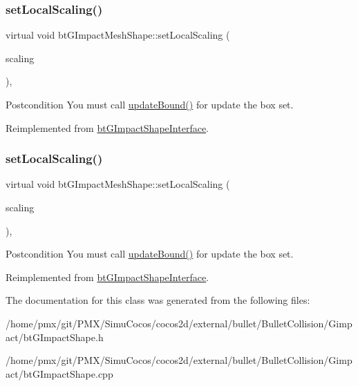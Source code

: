 \subsubsection{\texorpdfstring{set\+Local\+Scaling()}{setLocalScaling()}\hspace{0.1cm}{\footnotesize\ttfamily [1/2]}}
{\footnotesize\ttfamily virtual void bt\+G\+Impact\+Mesh\+Shape\+::set\+Local\+Scaling (\begin{DoxyParamCaption}\item[{const bt\+Vector3 \&}]{scaling }\end{DoxyParamCaption})\hspace{0.3cm}{\ttfamily [inline]}, {\ttfamily [virtual]}}

\begin{DoxyPostcond}{Postcondition}
You must call \hyperlink{classbtGImpactShapeInterface_acb26c2d7a2aecabd06b996b72b848492}{update\+Bound()} for update the box set. 
\end{DoxyPostcond}


Reimplemented from \hyperlink{classbtGImpactShapeInterface_adec0bd43cd0105b1d0dc172bc7db50d8}{bt\+G\+Impact\+Shape\+Interface}.

\mbox{\label{classbtGImpactMeshShape_aed8d5e4b2e75538109909d44b244bc35}} 
\subsubsection{\texorpdfstring{set\+Local\+Scaling()}{setLocalScaling()}\hspace{0.1cm}{\footnotesize\ttfamily [2/2]}}
{\footnotesize\ttfamily virtual void bt\+G\+Impact\+Mesh\+Shape\+::set\+Local\+Scaling (\begin{DoxyParamCaption}\item[{const bt\+Vector3 \&}]{scaling }\end{DoxyParamCaption})\hspace{0.3cm}{\ttfamily [inline]}, {\ttfamily [virtual]}}

\begin{DoxyPostcond}{Postcondition}
You must call \hyperlink{classbtGImpactShapeInterface_acb26c2d7a2aecabd06b996b72b848492}{update\+Bound()} for update the box set. 
\end{DoxyPostcond}


Reimplemented from \hyperlink{classbtGImpactShapeInterface_adec0bd43cd0105b1d0dc172bc7db50d8}{bt\+G\+Impact\+Shape\+Interface}.



The documentation for this class was generated from the following files\+:\begin{DoxyCompactItemize}
\item 
/home/pmx/git/\+P\+M\+X/\+Simu\+Cocos/cocos2d/external/bullet/\+Bullet\+Collision/\+Gimpact/bt\+G\+Impact\+Shape.\+h\item 
/home/pmx/git/\+P\+M\+X/\+Simu\+Cocos/cocos2d/external/bullet/\+Bullet\+Collision/\+Gimpact/bt\+G\+Impact\+Shape.\+cpp\end{DoxyCompactItemize}
